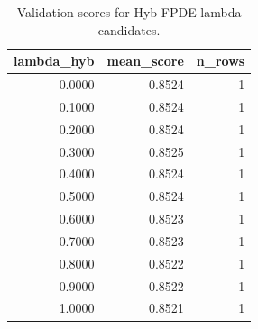 \begin{table}[t]
\caption{Validation scores for Hyb-FPDE lambda candidates.}
\label{tab:lambda_distribution_computed}
\centering
\begin{tabular}{rrr}
\toprule
lambda\_hyb & mean\_score & n\_rows \\
\midrule
0.0000 & 0.8524 & 1 \\
0.1000 & 0.8524 & 1 \\
0.2000 & 0.8524 & 1 \\
0.3000 & 0.8525 & 1 \\
0.4000 & 0.8524 & 1 \\
0.5000 & 0.8524 & 1 \\
0.6000 & 0.8523 & 1 \\
0.7000 & 0.8523 & 1 \\
0.8000 & 0.8522 & 1 \\
0.9000 & 0.8522 & 1 \\
1.0000 & 0.8521 & 1 \\
\bottomrule
\end{tabular}

\end{table}
